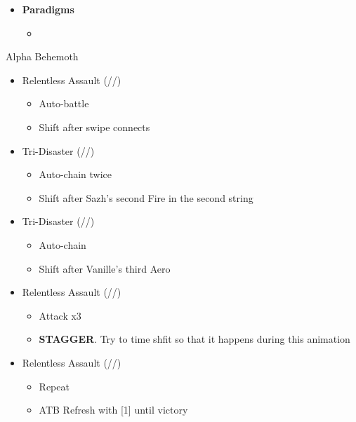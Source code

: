 \begin{multicols}{2}
\begin{menu}
\begin{itemize}
    \item \textbf{Paradigms}
    \begin{itemize}
        \item {}%
{\paradigmline[1]{\textit{\com}}{\textit{\rav}}{\textit{\rav}}}%
{\paradigmline{\com}{\med}{\rav}}%
{\paradigmline{[\rav]}{\rav}{\rav}}%
{\paradigmline{[\rav]}{\rav}{\rav}}%
{\paradigmline{[\com]}{\rav}{\rav}}
    \end{itemize}
\end{itemize}
\end{menu}

\renewcommand{\first}{[1] Relentless Assault (\com/\rav/\rav)}
\renewcommand{\second}{[2] Diversity (\com/\med/\rav)}
\renewcommand{\third}{[3] Tri-Disaster (\rav/\rav/\rav)}
\renewcommand{\fourth}{[4] Tri-Disaster (\rav/\rav/\rav)}
\renewcommand{\fifth}{[5] Relentless Assault (\com/\rav/\rav)}

\vfill

\begin{battle}{Alpha Behemoth}
\begin{itemize}
    \item \first
    \begin{itemize}
        \item Auto-battle
        \item Shift after swipe connects
    \end{itemize}
    \item \third
    \begin{itemize}
        \item Auto-chain twice
        \item Shift after Sazh's second Fire in the second string
    \end{itemize}
    \item \fourth
    \begin{itemize}
        \item Auto-chain
        \item Shift after Vanille's third Aero
    \end{itemize}
    \item \first
    \begin{itemize}
        \item Attack x3
        \item \textbf{STAGGER}. Try to time shfit so that it happens during this animation
    \end{itemize}
    \item \fifth
    \begin{itemize}
        \item Repeat
        \item ATB Refresh with [1] until victory
    \end{itemize}
\end{itemize}
\end{battle}


\end{multicols}
